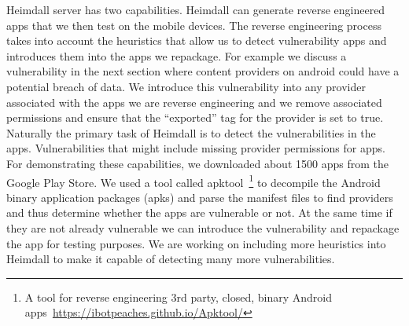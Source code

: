 \noindent
Heimdall server has two capabilities. Heimdall can generate reverse engineered apps that we then test on the mobile devices. The reverse engineering process takes into account the heuristics that allow us to detect vulnerability apps and introduces them into the apps we repackage. For example we discuss a vulnerability in the next section where content providers on android could have a potential breach of data. We introduce this vulnerability into any provider associated with the apps we are reverse engineering and we remove associated permissions and ensure that the ``exported'' tag for the provider is set to true. Naturally the primary task of Heimdall is to detect the vulnerabilities in the apps. Vulnerabilities that might include missing provider permissions for apps. For demonstrating these capabilities, we downloaded about 1500 apps from the Google Play Store. We used a tool called apktool~\footnote{A tool for reverse engineering 3rd party, closed, binary Android apps~\url{https://ibotpeaches.github.io/Apktool/}} to decompile the Android binary application packages (apks) and parse the manifest files to find providers and thus determine whether the apps are vulnerable or not. At the same time if they are not already vulnerable we can introduce the vulnerability and repackage the app for testing purposes. We are working on including more heuristics into Heimdall to make it capable of detecting many more vulnerabilities.